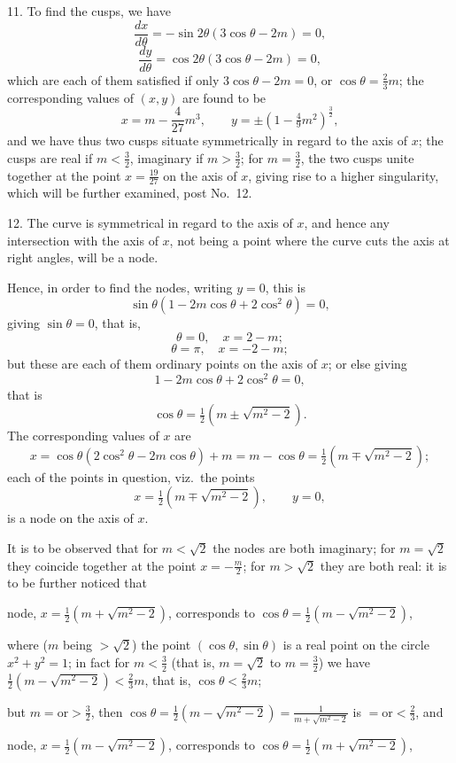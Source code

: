 \documentclass[11pt,a4paper]{article}
\theoremstyle{plain}
\begin{document}
11. To find the cusps, we have
\[
\frac{dx}{d\theta} = -\sin 2\theta(3\cos\theta - 2m) = 0,
\]
\[
\frac{dy}{d\theta} = \cos 2\theta(3\cos\theta - 2m) = 0,
\]
which are each of them satisfied if only $3\cos\theta - 2m = 0$, or $\cos\theta = \frac23m$; the corresponding values of $(x, y)$ are found to be
\[
x = m - \frac{4}{27}m^3, \qquad y = \pm(1 - \tfrac49m^2)^{\frac32},
\]
and we have thus two cusps situate symmetrically in regard to the axis of $x$; the cusps are real if $m < \frac32$, imaginary if $m > \frac32$; for $m = \frac32$, the two cusps unite together at the point $x = \frac{19}{27}$ on the axis of $x$, giving rise to a higher singularity, which will be further examined, post No.~12.

12. The curve is symmetrical in regard to the axis of $x$, and hence any intersection with the axis of $x$, not being a point where the curve cuts the axis at right angles, will be a node.

Hence, in order to find the nodes, writing $y = 0$, this is
\[
\sin\theta(1 - 2m\cos\theta + 2\cos^2\theta) = 0,
\]
giving $\sin\theta = 0$, that is,
\[
\theta = 0, \quad x = 2 - m;
\]
\[
\theta = \pi, \quad x = -2 - m;
\]
but these are each of them ordinary points on the axis of $x$; or else giving
\[
1 - 2m\cos\theta + 2\cos^2\theta = 0,
\]
that is
\[
\cos\theta = \tfrac12(m \pm \sqrt{m^2 - 2}).
\]
The corresponding values of $x$ are
\[
x = \cos\theta(2\cos^2\theta - 2m\cos\theta) + m = m - \cos\theta = \tfrac12(m \mp \sqrt{m^2 - 2});
\]
each of the points in question, viz.\ the points
\[
x = \tfrac12(m \mp \sqrt{m^2 - 2}), \qquad y = 0,
\]
is a node on the axis of $x$.

It is to be observed that for $m < \sqrt{2}$ the nodes are both imaginary; for $m = \sqrt{2}$ they coincide together at the point $x = -\frac{m}{2}$; for $m > \sqrt{2}$ they are both real: it is to be further noticed that

node, $x = \tfrac12(m + \sqrt{m^2 - 2})$, corresponds to $\cos\theta = \tfrac12(m - \sqrt{m^2 - 2})$,

where ($m$ being $> \sqrt{2}$) the point $(\cos\theta, \sin\theta)$ is a real point on the circle $x^2 + y^2 = 1$; in fact for $m < \frac32$ (that is, $m = \sqrt{2}$ to $m = \frac32$) we have $\frac12(m - \sqrt{m^2 - 2}) < \frac23m$, that is, $\cos\theta < \frac23m$;

but $m = \text{or} > \frac32$, then $\cos\theta = \frac12(m - \sqrt{m^2 - 2}) = \frac{1}{m + \sqrt{m^2 - 2}}$ is $= \text{or} < \frac23$, and

node, $x = \tfrac12(m - \sqrt{m^2 - 2})$, corresponds to $\cos\theta = \tfrac12(m + \sqrt{m^2 - 2})$,
\end{document}
